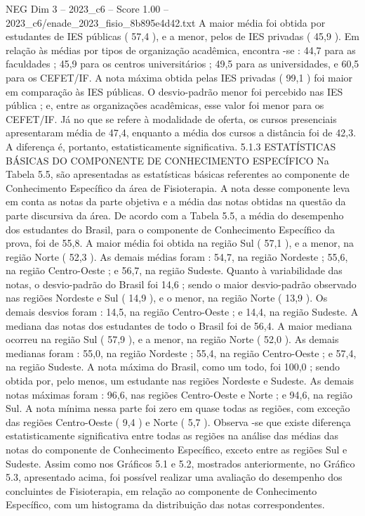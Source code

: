 \begin{textsample}{NEG Dim 3 – 2023\_c6 – Score 1.00 – 2023\_c6/enade\_2023\_fisio\_8b895e4d42.txt}
A maior média foi obtida por estudantes de IES públicas ( 57,4 ), e a menor, pelos de IES privadas ( 45,9 ).
Em relação às médias por tipos de organização acadêmica, encontra -se : 44,7 para as faculdades ; 45,9 para os centros universitários ; 49,5 para as universidades, e 60,5 para os CEFET/IF.
A nota máxima obtida pelas IES privadas ( 99,1 ) foi maior em comparação às IES públicas.
O desvio-padrão menor foi percebido nas IES pública ; e, entre as organizações acadêmicas, esse valor foi menor para os CEFET/IF.
Já no que se refere à modalidade de oferta, os cursos presenciais apresentaram média de 47,4, enquanto a média dos cursos a distância foi de 42,3.
A diferença é, portanto, estatisticamente significativa. 5.1.3 ESTATÍSTICAS BÁSICAS DO COMPONENTE DE CONHECIMENTO ESPECÍFICO Na Tabela 5.5, são apresentadas as estatísticas básicas referentes ao componente de Conhecimento Específico da área de Fisioterapia.
A nota desse componente leva em conta as notas da parte objetiva e a média das notas obtidas na questão da parte discursiva da área.
De acordo com a Tabela 5.5, a média do desempenho dos estudantes do Brasil, para o componente de Conhecimento Específico da prova, foi de 55,8.
A maior média foi obtida na região Sul ( 57,1 ), e a menor, na região Norte ( 52,3 ).
As demais médias foram : 54,7, na região Nordeste ; 55,6, na região Centro-Oeste ; e 56,7, na região Sudeste.
Quanto à variabilidade das notas, o desvio-padrão do Brasil foi 14,6 ; sendo o maior desvio-padrão observado nas regiões Nordeste e Sul ( 14,9 ), e o menor, na região Norte ( 13,9 ).
Os demais desvios foram : 14,5, na região Centro-Oeste ; e 14,4, na região Sudeste.
A mediana das notas dos estudantes de todo o Brasil foi de 56,4.
A maior mediana ocorreu na região Sul ( 57,9 ), e a menor, na região Norte ( 52,0 ).
As demais medianas foram : 55,0, na região Nordeste ; 55,4, na região Centro-Oeste ; e 57,4, na região Sudeste.
A nota máxima do Brasil, como um todo, foi 100,0 ; sendo obtida por, pelo menos, um estudante nas regiões Nordeste e Sudeste.
As demais notas máximas foram : 96,6, nas regiões Centro-Oeste e Norte ; e 94,6, na região Sul.
A nota mínima nessa parte foi zero em quase todas as regiões, com exceção das regiões Centro-Oeste ( 9,4 ) e Norte ( 5,7 ).
Observa -se que existe diferença estatisticamente significativa entre todas as regiões na análise das médias das notas do componente de Conhecimento Específico, exceto entre as regiões Sul e Sudeste.
Assim como nos Gráficos 5.1 e 5.2, mostrados anteriormente, no Gráfico 5.3, apresentado acima, foi possível realizar uma avaliação do desempenho dos concluintes de Fisioterapia, em relação ao componente de Conhecimento Específico, com um histograma da distribuição das notas correspondentes.

\end{textsample}

